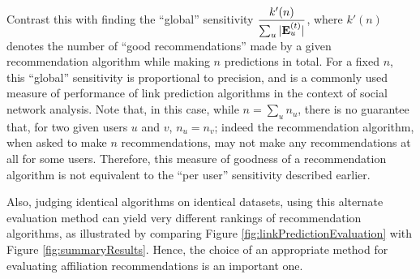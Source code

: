 Contrast this with finding the ``global'' sensitivity $\dfrac{k'(n)}{\sum_u |\mathbf{E}_u^{(t)}|}$, where $k'(n)$ denotes the number of ``good recommendations'' made by a given recommendation algorithm while making $n$ predictions in total. For a fixed $n$, this ``global'' sensitivity is proportional to precision, and is a commonly used measure of performance of link prediction algorithms in the context of social network analysis. Note that, in this case, while $n = \sum_u n_u$, there is no guarantee that, for two given users $u$ and $v$, $n_u = n_v$; indeed the recommendation algorithm, when asked to make $n$ recommendations, may not make any recommendations at all for some users. Therefore, this measure of goodness of a recommendation algorithm is not equivalent to the ``per user'' sensitivity described earlier.

Also, judging identical algorithms on identical datasets, using this alternate evaluation method can yield very different rankings of recommendation algorithms, as illustrated by comparing Figure \ref{fig:linkPredictionEvaluation} with Figure \ref{fig:summaryResults}. Hence, the choice of an appropriate method for evaluating affiliation recommendations is an important one. 

